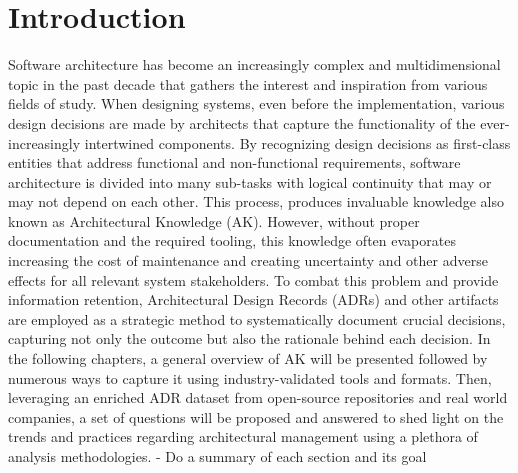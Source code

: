 \chapter{Introduction}
    Software architecture has become an increasingly complex and multidimensional topic in the past decade that gathers the interest and inspiration from various fields of study. When designing systems, even before the implementation, various design decisions are made by architects that capture the functionality of the ever-increasingly intertwined components. By recognizing design decisions as first-class entities that address functional and non-functional requirements, software architecture is divided into many sub-tasks with logical continuity that may or may not depend on each other.\cite{Arch+DesignDescisions} This process, produces invaluable knowledge also known as Architectural Knowledge (AK). However, without proper documentation and the required tooling, this knowledge often evaporates increasing the cost of maintenance and creating uncertainty and other adverse effects for all relevant system stakeholders. To combat this problem and provide information retention,  Architectural Design Records (ADRs) and other artifacts are employed as a strategic method to systematically document crucial decisions, capturing not only the outcome but also the rationale behind each decision. In the following chapters, a general overview of AK will be presented followed by numerous ways to capture it using industry-validated tools and formats. Then, leveraging an enriched ADR dataset from open-source repositories and real world companies, a set of questions will be proposed and answered to shed light on the trends and practices regarding architectural management using a plethora of analysis methodologies.
    - Do a summary of each section and its goal